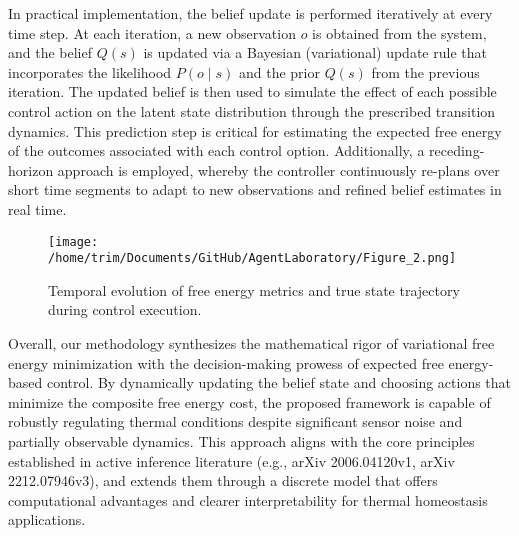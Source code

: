 \documentclass[11pt]{article}
\begin{document}
In practical implementation, the belief update is performed iteratively at every time step. At each iteration, a new observation \(o\) is obtained from the system, and the belief \(Q(s)\) is updated via a Bayesian (variational) update rule that incorporates the likelihood \(P(o\mid s)\) and the prior \(Q(s)\) from the previous iteration. The updated belief is then used to simulate the effect of each possible control action on the latent state distribution through the prescribed transition dynamics. This prediction step is critical for estimating the expected free energy of the outcomes associated with each control option. Additionally, a receding-horizon approach is employed, whereby the controller continuously re-plans over short time segments to adapt to new observations and refined belief estimates in real time.

\begin{figure}[h]
\caption{Temporal evolution of free energy metrics and true state trajectory during control execution.}
\centering
\texttt{[image: /home/trim/Documents/GitHub/AgentLaboratory/Figure\_2.png]}
\label{fig:fig2}
\end{figure}

Overall, our methodology synthesizes the mathematical rigor of variational free energy minimization with the decision-making prowess of expected free energy-based control. By dynamically updating the belief state and choosing actions that minimize the composite free energy cost, the proposed framework is capable of robustly regulating thermal conditions despite significant sensor noise and partially observable dynamics. This approach aligns with the core principles established in active inference literature (e.g., arXiv 2006.04120v1, arXiv 2212.07946v3), and extends them through a discrete model that offers computational advantages and clearer interpretability for thermal homeostasis applications.
\end{document}
